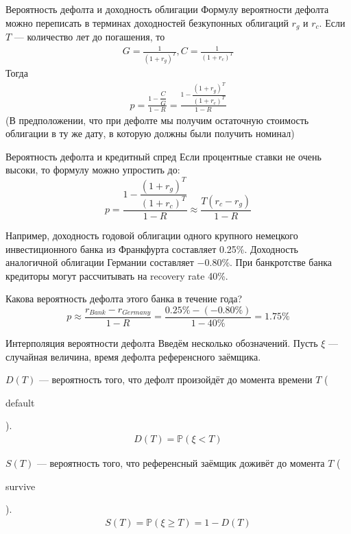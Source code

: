 \documentclass{beamer}
\newcommand{\en}[1]{\begin{otherlanguage}{english}#1\end{otherlanguage}}
\begin{document}
\begin{frame}{Вероятность дефолта и доходность облигации}
\justify
Формулу вероятности дефолта можно переписать в терминах доходностей безкупонных облигаций $r_g$ и $r_c$. Если $T$ --- количество лет до погашения, то
\begin{align*}
G = \frac{1}{(1 + r_g)^T}, C = \frac{1}{(1 + r_c)^T}
\end{align*}
Тогда
\begin{align*}
p = \frac{1 - \dfrac{C}{G}}{1-R} = \frac{1 - \dfrac{(1 + r_g)^T}{(1 + r_c)^T}}{1 - R}
\end{align*}
(В предположении, что при дефолте мы получим остаточную стоимость облигации в ту же дату, в которую должны были получить номинал)
\end{frame}



\begin{frame}{Вероятность дефолта и кредитный спред}
\justify
Если процентные ставки не очень высоки, то формулу можно упростить до:
\begin{equation*}
p = \frac{1 - \dfrac{(1 + r_g)^T}{(1 + r_c)^T}}{1 - R} \approx \frac{T(r_c - r_g)}{1 - R}
\end{equation*}

\justify
Например, доходность годовой облигации одного крупного немецкого инвестиционного банка из Франкфурта составляет 0.25\%. Доходность аналогичной облигации Германии составляет $-0.80\%$. При банкротстве банка кредиторы могут рассчитывать на recovery rate 40\%.

\justify
Какова вероятность дефолта этого банка в течение года?
\begin{equation*}
p \approx \frac{r_{Bank} - r_{Germany}}{1-R} = \frac{0.25\% - (-0.80\%)}{1-40\%} = 1.75\%
\end{equation*}
\end{frame}



\begin{frame}{Интерполяция вероятности дефолта}
\justify
Введём несколько обозначений. Пусть $\xi$ --- случайная величина, время дефолта референсного заёмщика.

\justify
$D(T)$ --- вероятность того, что дефолт произойдёт до момента времени $T$ (\en{default}).
\begin{align*}
D(T) = \mathbb{P}(\xi < T)
\end{align*}

\justify
$S(T)$ --- вероятность того, что референсный заёмщик доживёт до момента $T$ (\en{survive}).
\begin{align*}
S(T) = \mathbb{P}(\xi \ge T) = 1 - D(T)
\end{align*}
\end{frame}
\end{document}
